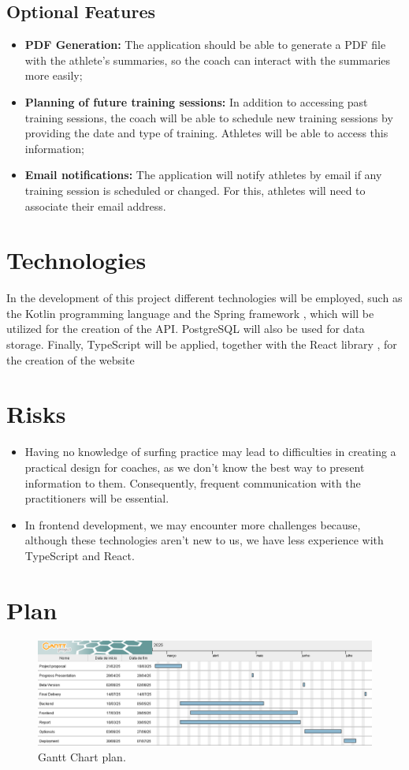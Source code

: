 \documentclass[a4paper,twoside,11pt]{article}
\begin{document}
\subsection{Optional Features}
\begin{itemize}
\item \textbf{PDF Generation:} The application should be able to generate a PDF file with the athlete's summaries, so the coach can interact with the summaries more easily;
\item \textbf{Planning of future training sessions:} In addition to accessing past training sessions, the coach will be able to schedule new training sessions by providing the date and type of training. Athletes will be able to access this information;
\item \textbf{Email notifications:} The application will notify athletes by email if any training session is scheduled or changed. For this, athletes will need to associate their email address.
\end{itemize}

\section{Technologies}
In the development of this project different technologies will be employed, such as the Kotlin programming language \cite{kotlin} and the Spring framework \cite{spring}, which will be utilized for the creation of the API. PostgreSQL \cite{postgresql} will also be used for data storage. Finally, TypeScript \cite{typescript} will be applied, together with the React library \cite{react}, for the creation of the website

\section{Risks}
\begin{itemize}
\item Having no knowledge of surfing practice may lead to difficulties in creating a practical design for coaches, as we don’t know the best way to present information to them. Consequently, frequent communication with the practitioners will be essential.
\item In frontend development, we may encounter more challenges because, although these technologies aren't new to us, we have less experience with TypeScript and React.
\end{itemize}

\section{Plan}
\begin{figure}[h]
\centering
\includegraphics [width=6in]{GanttChart.png}
\caption{Gantt Chart plan.}
\end{figure}



\end{document}
